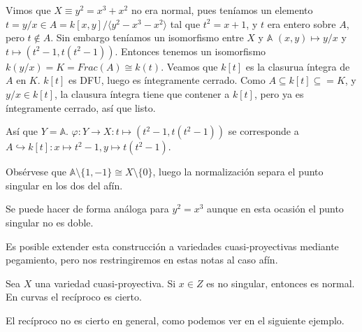 \documentclass[ACGA.tex]{subfiles}
\begin{document}
\begin{ejs}
Vimos que $X\equiv y^2=x^3+x^2$ no era normal, pues teníamos un elemento $t=y/x\in A=k[x,y]/\langle y^2-x^3-x^2\rangle$ tal que $t^2=x+1$, y $t$ era entero sobre $A$, pero $t\notin A$. Sin embargo teníamos un isomorfismo entre $X$ y $\mathbb{A}$ $(x,y)\mapsto y/x$ y $t\mapsto (t^2-1,t(t^2-1))$. Entonces tenemos un isomorfismo $k(y/x)=K=Frac(A)\cong k(t)$.  Veamos que $k[t]$ es la clasurua íntegra de $A$ en $K$. $k[t]$ es DFU, luego es íntegramente cerrado. Como $A\subseteq k[t]\subseteq =K$, y $y/x\in k[t]$, la clausura íntegra tiene que contener a $k[t]$, pero ya es íntegramente cerrado, así que listo.

Así que $Y=\mathbb{A}$. $\varphi: Y\to X: t\mapsto (t^2-1,t(t^2-1))$ se corresponde a $A\hookrightarrow k[t]: x\mapsto t^2-1, y\mapsto t(t^2-1)$. 

Obsérvese que $\mathbb{A}\setminus\{1,-1\}\cong X\setminus\{0\}$, luego la normalización separa el punto singular en los dos del afín. 

Se puede hacer de forma análoga para $y^2=x^3$ aunque en esta ocasión el punto singular no es doble.
\end{ejs}

Es posible extender esta construcción a variedades cuasi-proyectivas mediante pegamiento, pero nos restringiremos en estas notas al caso afín.

\begin{prop}
Sea $X$ una variedad cuasi-proyectiva. Si $x\in Z$ es no singular, entonces es normal. En curvas el recíproco es cierto.
\end{prop}

El recíproco no es cierto en general, como podemos ver en el siguiente ejemplo.
\end{document}
